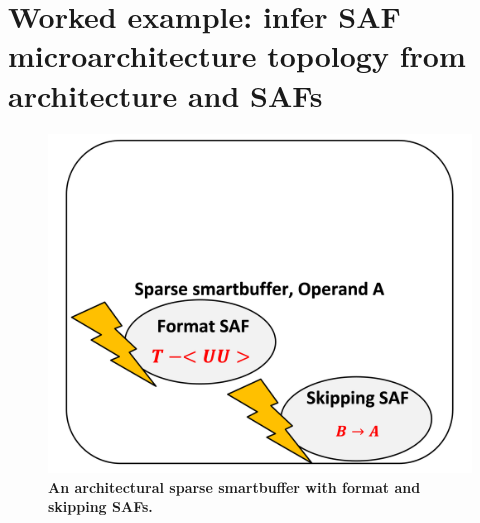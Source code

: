 \chapter{Worked example: infer SAF microarchitecture topology from architecture and SAFs}

\begin{figure}[H]
\includegraphics[width=\textwidth]{figures/safinfer_build_00saf.png}
\caption{\textbf{An architectural sparse smartbuffer with format and skipping SAFs.}}
\label{fig:safinfer_build_00saf}
\centering
\end{figure}



